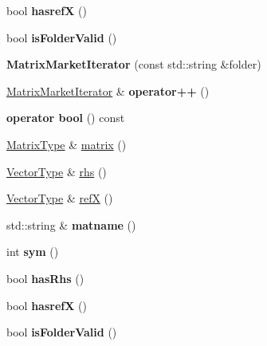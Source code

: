 \begin{DoxyCompactItemize}
bool {\bfseries hasrefX} ()
\item 
\mbox{\label{class_eigen_1_1_matrix_market_iterator_aa22ef404397d28d17f29739fc7e91cf5}} 
bool {\bfseries is\+Folder\+Valid} ()
\item 
\mbox{\label{class_eigen_1_1_matrix_market_iterator_afeab9fb15c3bdcbf4992f49388774478}} 
{\bfseries Matrix\+Market\+Iterator} (const std\+::string \&folder)
\item 
\mbox{\label{class_eigen_1_1_matrix_market_iterator_a26a6bd6f595f4f4aeccd7c5908e19719}} 
\hyperlink{class_eigen_1_1_matrix_market_iterator}{Matrix\+Market\+Iterator} \& {\bfseries operator++} ()
\item 
\mbox{\label{class_eigen_1_1_matrix_market_iterator_a4fe537c57505b15338f68b60d6a6df16}} 
{\bfseries operator bool} () const
\item 
\hyperlink{group___sparse_core___module}{Matrix\+Type} \& \hyperlink{class_eigen_1_1_matrix_market_iterator_ac938961d685306ef5b48d9943f7dcabd}{matrix} ()
\item 
\hyperlink{group___core___module}{Vector\+Type} \& \hyperlink{class_eigen_1_1_matrix_market_iterator_ac141e537f3bc3a3c078a2780a6a956b6}{rhs} ()
\item 
\hyperlink{group___core___module}{Vector\+Type} \& \hyperlink{class_eigen_1_1_matrix_market_iterator_a80f334d9fbbed0d24ba0c32d2bea16bc}{refX} ()
\item 
\mbox{\label{class_eigen_1_1_matrix_market_iterator_a93fa4e525f91d77e178fd3e034b45d29}} 
std\+::string \& {\bfseries matname} ()
\item 
\mbox{\label{class_eigen_1_1_matrix_market_iterator_ace72fd4804dfc9c7fc9018f2712be9fe}} 
int {\bfseries sym} ()
\item 
\mbox{\label{class_eigen_1_1_matrix_market_iterator_a244896bf045ee138e1bfe025907c9b3c}} 
bool {\bfseries has\+Rhs} ()
\item 
\mbox{\label{class_eigen_1_1_matrix_market_iterator_a79fac8d6fd3246f4050d2d93ffd8b961}} 
bool {\bfseries hasrefX} ()
\item 
\mbox{\label{class_eigen_1_1_matrix_market_iterator_aa22ef404397d28d17f29739fc7e91cf5}} 
bool {\bfseries is\+Folder\+Valid} ()
\end{DoxyCompactItemize}
